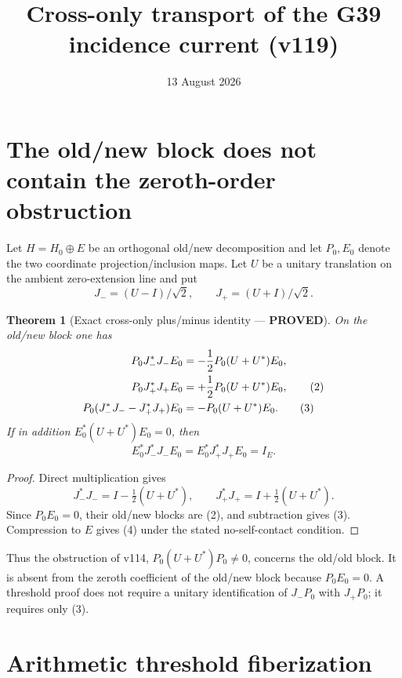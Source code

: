 \documentclass[11pt]{article}
\title{Cross-only transport of the G39 incidence current (v119)}
\date{13 August 2026}
\newcommand{\PROVED}{\textcolor{green!40!black}{\textbf{PROVED}}}
\newtheorem{theorem}{Theorem}
\begin{document}
\maketitle

\section{The old/new block does not contain the zeroth-order obstruction}

Let $H=H_0\oplus E$ be an orthogonal old/new decomposition and let
$P_0,E_0$ denote the two coordinate projection/inclusion maps.  Let $U$ be
a unitary translation on the ambient zero-extension line and put
\begin{equation}
 J_-=(U-I)/\sqrt2,\qquad J_+=(U+I)/\sqrt2.                    \tag{1}
\end{equation}

\begin{theorem}[Exact cross-only plus/minus identity --- \PROVED]
On the old/new block one has
\begin{align}
 P_0J_-^*J_-E_0&=-\frac12P_0(U+U^*)E_0,\notag\\
 P_0J_+^*J_+E_0&=+\frac12P_0(U+U^*)E_0,                     \tag{2}\\
 P_0(J_-^*J_--J_+^*J_+)E_0&=-P_0(U+U^*)E_0.                \tag{3}
\end{align}
If in addition $E_0^*(U+U^*)E_0=0$, then
\begin{equation}
 E_0^*J_-^*J_-E_0=E_0^*J_+^*J_+E_0=I_E.                   \tag{4}
\end{equation}
\end{theorem}

\begin{proof}
Direct multiplication gives
\[
 J_-^*J_-=I-\tfrac12(U+U^*),\qquad
 J_+^*J_+=I+\tfrac12(U+U^*).
\]
Since $P_0E_0=0$, their old/new blocks are (2), and subtraction gives
(3).  Compression to $E$ gives (4) under the stated no-self-contact
condition.
\end{proof}

Thus the obstruction of v114, $P_0(U+U^*)P_0\ne0$, concerns the old/old
block.  It is absent from the zeroth coefficient of the old/new block
because $P_0E_0=0$.  A threshold proof does not require a unitary
identification of $J_-P_0$ with $J_+P_0$; it requires only (3).

\section{Arithmetic threshold fiberization}
\end{document}
